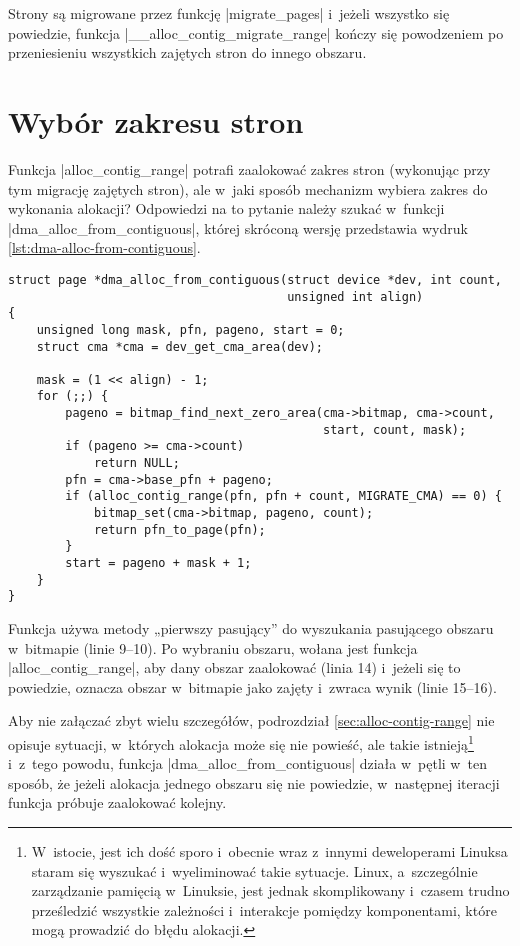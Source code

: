 Strony są migrowane przez funkcję \code|migrate_pages| i~jeżeli
wszystko się powiedzie, funkcja \code|__alloc_contig_migrate_range|
kończy się powodzeniem po przeniesieniu wszystkich zajętych stron do
innego obszaru.


\section{Wybór zakresu stron}\label{sec:alloc-from-contig}

Funkcja \code|alloc_contig_range| potrafi zaalokować zakres stron
(wykonując przy tym migrację zajętych stron), ale w~jaki sposób
mechanizm  wybiera zakres do wykonania alokacji?  Odpowiedzi
na to pytanie należy szukać w~funkcji
\code|dma_alloc_from_contiguous|, której skróconą wersję przedstawia
wydruk \ref{lst:dma-alloc-from-contiguous}.

\begin{lstlisting}[float=tb,caption={Skrócony wydruk funkcji
    \code|dma_alloc_from_contiguous| z Linuksa
    3.5.},label=lst:dma-alloc-from-contiguous]
struct page *dma_alloc_from_contiguous(struct device *dev, int count,
                                       unsigned int align)
{
	unsigned long mask, pfn, pageno, start = 0;
	struct cma *cma = dev_get_cma_area(dev);

	mask = (1 << align) - 1;
	for (;;) {
		pageno = bitmap_find_next_zero_area(cma->bitmap, cma->count,
		                                    start, count, mask);
		if (pageno >= cma->count)
			return NULL;
		pfn = cma->base_pfn + pageno;
		if (alloc_contig_range(pfn, pfn + count, MIGRATE_CMA) == 0) {
			bitmap_set(cma->bitmap, pageno, count);
			return pfn_to_page(pfn);
		}
		start = pageno + mask + 1;
	}
}
\end{lstlisting}

Funkcja używa metody „pierwszy pasujący” do wyszukania pasującego
obszaru w~bitmapie (linie 9--10).  Po wybraniu obszaru, wołana jest
funkcja \code|alloc_contig_range|, aby dany obszar zaalokować
(linia 14) i~jeżeli się to powiedzie, oznacza obszar w~bitmapie jako
zajęty i~zwraca wynik (linie 15--16).

Aby nie załączać zbyt wielu szczegółów, podrozdział
\ref{sec:alloc-contig-range} nie opisuje sytuacji, w~których alokacja
może się nie powieść, ale takie istnieją\footnote{W~istocie, jest ich
  dość sporo i~obecnie wraz z~innymi deweloperami Linuksa staram się
  wyszukać i~wyeliminować takie sytuacje.  Linux, a~szczególnie
  zarządzanie pamięcią w~Linuksie, jest jednak skomplikowany i~czasem
  trudno prześledzić wszystkie zależności i~interakcje pomiędzy
  komponentami, które mogą prowadzić do błędu alokacji.} i~z~tego
powodu, funkcja \code|dma_alloc_from_contiguous| działa w~pętli w~ten
sposób, że jeżeli alokacja jednego obszaru się nie powiedzie,
w~następnej iteracji funkcja próbuje zaalokować kolejny.

